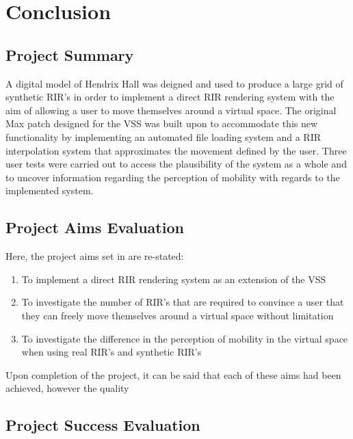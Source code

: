\documentclass[../../main.tex]{subfiles}
\begin{document}
	\section{Conclusion}
	
		\subsection{Project Summary}
		A digital model of Hendrix Hall was deigned and used to produce a large grid of synthetic \ac{RIR}'s in order to implement a direct \ac{RIR} rendering system with the aim of allowing a user to move themselves around a virtual space. The original Max patch designed for the \ac{VSS} was built upon to accommodate this new functionality by implementing an automated file loading system and a \ac{RIR} interpolation system that approximates the movement defined by the user. Three user tests were carried out to access the plausibility of the system as a whole and to uncover information regarding the perception of mobility with regards to the implemented system. 

		\subsection{Project Aims Evaluation}

		Here, the project aims set in  are re-stated:

		\begin{enumerate}
			\item To implement a direct \ac{RIR} rendering system as an extension of the \ac{VSS}

			\item To investigate the number of \ac{RIR}'s that are required to convince a user that they can freely move themselves around a virtual space without limitation

			\item To investigate the difference in the perception of mobility in the virtual space when using real \ac{RIR}'s and synthetic \ac{RIR}'s
		\end{enumerate}

		Upon completion of the project, it can be said that each of these aims had been achieved, however the quality

		\subsection{Project Success Evaluation}
\end{document}
